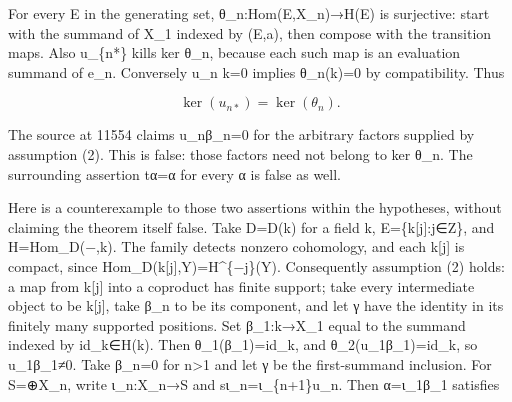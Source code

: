 \documentclass[11pt]{article}
\begin{document}
For every E in the generating set,\allowbreak{} θ\_\allowbreak{}n:\allowbreak{}Hom(E,\allowbreak{}X\_\allowbreak{}n)\allowbreak{}\allowbreak{}→H(E)\allowbreak{} is surjective:\allowbreak{} start with the summand of X\_\allowbreak{}1 indexed by (E,\allowbreak{}a)\allowbreak{},\allowbreak{} then compose with the transition maps. Also u\_\allowbreak{}\{n*\} kills ker θ\_\allowbreak{}n,\allowbreak{} because each such map is an evaluation summand of e\_\allowbreak{}n. Conversely u\_\allowbreak{}n k\allowbreak{}=0 implies θ\_\allowbreak{}n(k)\allowbreak{}\allowbreak{}=0 by compatibility. Thus

\[
 \ker(u_{n*})=\ker(\theta_n).
\]

The source at 11554 claims u\_\allowbreak{}nβ\_\allowbreak{}n\allowbreak{}=0 for the arbitrary factors supplied by assumption (2)\allowbreak{}. This is false:\allowbreak{} those factors need not belong to ker θ\_\allowbreak{}n. The surrounding assertion tα\allowbreak{}=α for every α is false as well.

Here is a counterexample to those two assertions within the hypotheses,\allowbreak{} without claiming the theorem itself false. Take D\allowbreak{}=D(k)\allowbreak{} for a field k,\allowbreak{} E\allowbreak{}=\{k[j]\allowbreak{}:\allowbreak{}j\allowbreak{}∈Z\},\allowbreak{} and H\allowbreak{}=Hom\_\allowbreak{}D(−,\allowbreak{}k)\allowbreak{}. The family detects nonzero cohomology,\allowbreak{} and each k[j]\allowbreak{} is compact,\allowbreak{} since Hom\_\allowbreak{}D(k[j]\allowbreak{},\allowbreak{}Y)\allowbreak{}\allowbreak{}=H\textasciicircum{}\{−j\}(Y)\allowbreak{}. Consequently assumption (2)\allowbreak{} holds:\allowbreak{} a map from k[j]\allowbreak{} into a coproduct has finite support; take every intermediate object to be k[j]\allowbreak{},\allowbreak{} take β\_\allowbreak{}n to be its component,\allowbreak{} and let γ have the identity in its finitely many supported positions. Set β\_\allowbreak{}1:\allowbreak{}k\allowbreak{}→X\_\allowbreak{}1 equal to the summand indexed by id\_\allowbreak{}k\allowbreak{}∈H(k)\allowbreak{}. Then θ\_\allowbreak{}1(β\_\allowbreak{}1)\allowbreak{}\allowbreak{}=id\_\allowbreak{}k,\allowbreak{} and θ\_\allowbreak{}2(u\_\allowbreak{}1β\_\allowbreak{}1)\allowbreak{}\allowbreak{}=id\_\allowbreak{}k,\allowbreak{} so u\_\allowbreak{}1β\_\allowbreak{}1≠0. Take β\_\allowbreak{}n\allowbreak{}=0 for n\textgreater1 and let γ be the first-summand inclusion. For S\allowbreak{}=\allowbreak{}⊕X\_\allowbreak{}n,\allowbreak{} write ι\_\allowbreak{}n:\allowbreak{}X\_\allowbreak{}n\allowbreak{}→S and sι\_\allowbreak{}n\allowbreak{}=ι\_\allowbreak{}\{n\allowbreak{}+1\}u\_\allowbreak{}n. Then α\allowbreak{}=ι\_\allowbreak{}1β\_\allowbreak{}1 satisfies
\end{document}
